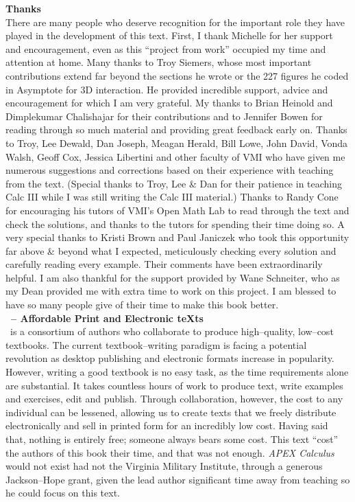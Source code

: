 \noindent\textbf{\large Thanks}\\

There are many people who deserve recognition for the important role they have played in the development of this text. First, I thank Michelle for her support and encouragement, even as this ``project from work'' occupied my time and attention at home. Many thanks to Troy Siemers, whose most important contributions extend far beyond the sections he wrote or the 227 figures he coded in Asymptote for 3D interaction.  He provided incredible support, advice and encouragement for which I am very grateful. My thanks to Brian Heinold and Dimplekumar Chalishajar for their contributions and to Jennifer Bowen for reading through so much material and providing great feedback early on. Thanks to Troy, Lee Dewald, Dan Joseph, Meagan Herald, Bill Lowe, John David, Vonda Walsh, Geoff Cox, Jessica Libertini and other faculty of VMI who have given me numerous suggestions and corrections based on their experience with teaching from the text. (Special thanks to Troy, Lee \& Dan for their patience in teaching Calc III while I was still writing the Calc III material.) Thanks to Randy Cone for encouraging his tutors of VMI's Open Math Lab to read through the text and check the solutions, and thanks to the tutors for spending their time doing so. A very special thanks to Kristi Brown and Paul Janiczek who took this opportunity far above \& beyond what I expected, meticulously checking every solution and carefully reading every example. Their comments have been extraordinarily helpful. I am also thankful for the support provided by Wane Schneiter, who as my Dean provided me with extra time to work on this project. I am blessed to have so many people give of their time to make this book better.\\

\clearpage
\noindent\textbf{\large \apex\  -- Affordable Print and Electronic teXts}\\

\apex\ is a consortium of authors  who collaborate to produce high--quality, low--cost textbooks. The current textbook--writing paradigm is facing a potential revolution as desktop publishing and electronic formats increase in popularity. However, writing a good textbook is no easy task, as the time requirements alone are substantial. It takes countless hours of work to produce text, write examples and exercises, edit and publish. Through collaboration, however, the cost to any individual can be lessened, allowing us to create texts that we freely distribute electronically and sell in printed form for an incredibly low cost. Having said that, nothing is entirely free; someone always bears some cost. This text ``cost'' the authors of this book their time, and that was not enough. \textit{APEX Calculus} would not exist had not the Virginia Military Institute, through a generous Jackson--Hope grant, given the lead author significant time away from teaching so he could focus on this text.

